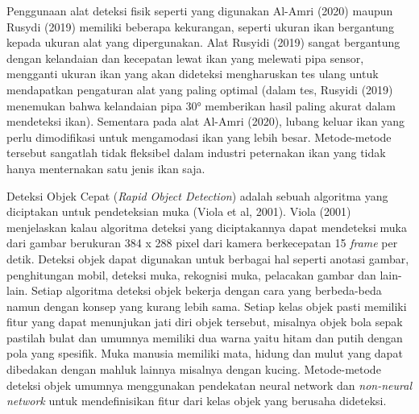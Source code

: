 Penggunaan alat deteksi fisik seperti yang digunakan Al-Amri (2020) maupun 
Rusydi (2019) memiliki beberapa kekurangan, seperti ukuran ikan bergantung 
kepada ukuran alat yang dipergunakan. Alat Rusyidi (2019) sangat bergantung 
dengan kelandaian dan kecepatan lewat ikan yang melewati pipa sensor, mengganti 
ukuran ikan yang akan dideteksi mengharuskan tes ulang untuk 
mendapatkan pengaturan alat yang paling optimal (dalam tes, Rusyidi (2019) 
menemukan bahwa kelandaian pipa 30° memberikan hasil paling akurat dalam 
mendeteksi ikan). Sementara pada alat Al-Amri (2020), lubang keluar 
ikan yang perlu dimodifikasi untuk mengamodasi ikan yang lebih besar. 
Metode-metode tersebut sangatlah tidak fleksibel dalam industri peternakan 
ikan yang tidak hanya menternakan satu jenis ikan saja.

Deteksi Objek Cepat (\emph{Rapid Object Detection}) adalah sebuah algoritma yang 
diciptakan untuk pendeteksian muka (Viola et al, 2001). Viola (2001) 
menjelaskan kalau algoritma deteksi yang diciptakannya dapat mendeteksi 
muka dari gambar berukuran 384 x 288 pixel dari kamera berkecepatan 15 
\textit{frame} per detik. Deteksi objek dapat digunakan untuk berbagai hal seperti 
anotasi gambar, penghitungan mobil, deteksi muka, rekognisi muka, pelacakan 
gambar dan lain-lain. Setiap algoritma deteksi objek bekerja dengan cara yang 
berbeda-beda namun dengan konsep yang kurang lebih sama. Setiap kelas objek 
pasti memiliki fitur yang dapat menunjukan jati diri objek tersebut, misalnya 
objek bola sepak pastilah bulat dan umumnya memiliki dua warna yaitu hitam dan 
putih dengan pola yang spesifik. Muka manusia memiliki mata, hidung dan mulut 
yang dapat dibedakan dengan mahluk lainnya misalnya dengan kucing. Metode-metode 
deteksi objek umumnya menggunakan pendekatan neural network dan 
\textit{non-neural network} untuk mendefinisikan fitur dari kelas objek yang 
berusaha dideteksi.

